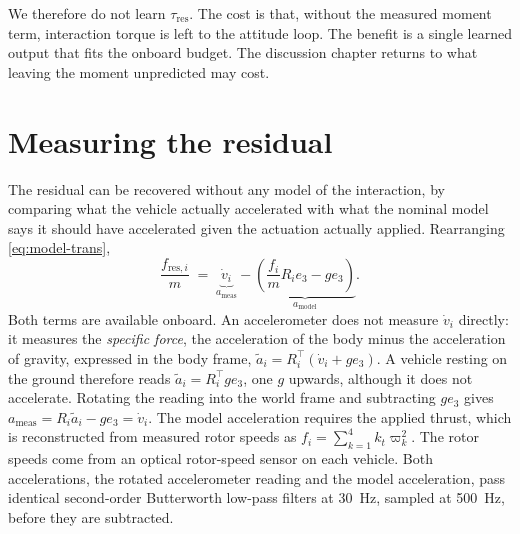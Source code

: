 We therefore do not learn $\tau_{\mathrm{res}}$. The cost is that, without the measured moment term,
interaction torque is left to the attitude loop. The benefit is a single learned output that fits
the onboard budget. The discussion chapter returns to what leaving the moment unpredicted may cost.

\section{Measuring the residual}
\label{sec:model-measure}

The residual can be recovered without any model of the interaction, by comparing what the vehicle
actually accelerated with what the nominal model says it should have accelerated given the
actuation actually applied. Rearranging \eqref{eq:model-trans},
%
\begin{equation}
  \frac{f_{\mathrm{res},i}}{m}
  \;=\; \underbrace{\dot{v}_i}_{a_{\mathrm{meas}}}
      - \underbrace{\left( \frac{f_i}{m} R_i e_3 - g e_3 \right)}_{a_{\mathrm{model}}} .
  \label{eq:model-ares}
\end{equation}
%
Both terms are available onboard. An accelerometer does not measure $\dot v_i$ directly: it
measures the \emph{specific force}, the acceleration of the body minus the acceleration of gravity,
expressed in the body frame, $\tilde a_i = R_i^\top(\dot v_i + g e_3)$. A vehicle resting on the
ground therefore reads $\tilde a_i = R_i^\top g e_3$, one $g$ upwards, although it does not
accelerate. Rotating the reading into the world frame and subtracting $g e_3$ gives
$a_{\mathrm{meas}} = R_i\tilde a_i - g e_3 = \dot v_i$. The model acceleration requires the applied
thrust, which is reconstructed from measured rotor speeds as $f_i = \sum_{k=1}^{4} k_t\varpi_k^2$.
The rotor speeds come from an optical rotor-speed sensor on each vehicle. Both accelerations, the
rotated accelerometer reading and the model acceleration, pass identical second-order Butterworth
low-pass filters at \SI{30}{\hertz}, sampled at \SI{500}{\hertz}, before they are subtracted.


